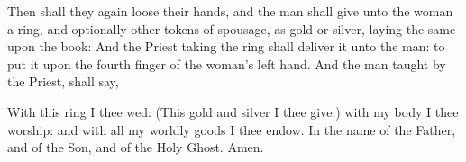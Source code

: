 \begin{rubric}
	Then shall they again loose their hands, and the man shall give unto the woman a ring, and 
	optionally other tokens of spousage, as gold or silver, laying the same upon the book: And the Priest taking the ring shall deliver it unto the man: to put it upon the fourth finger of the woman's left hand. And the man taught by the Priest, shall say,
\end{rubric}\par\noindent
With this ring I thee wed: (This gold and silver I thee give:) with my body I thee worship: and with all my worldly goods I thee endow. In the name of the Father, and of the Son, and of the Holy Ghost. Amen.

